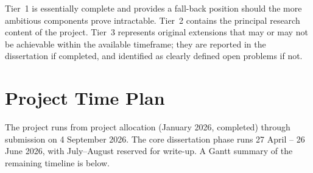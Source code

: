 \documentclass[11pt,a4paper]{article}
\begin{document}
Tier~1 is essentially complete and provides a fall-back position
should the more ambitious components prove intractable.  Tier~2
contains the principal research content of the project.  Tier~3
represents original extensions that may or may not be achievable
within the available timeframe; they are reported in the
dissertation if completed, and identified as clearly defined open
problems if not.


\section{Project Time Plan}\label{sec:plan}

The project runs from project allocation (January 2026, completed)
through submission on 4 September 2026.  The core dissertation phase
runs 27 April -- 26 June 2026, with July--August reserved for
write-up.  A Gantt summary of the remaining timeline is below.
\end{document}
